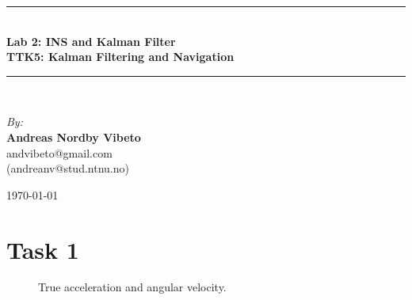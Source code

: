 \documentclass{article}
\newcommand{\HRule}{\rule{\linewidth}{0.5mm}}
\begin{document}

\begin{center}

\HRule \\[0.4cm]
{ \huge \bfseries Lab 2: INS and Kalman Filter \\[0.4cm] 
\Large \bfseries TTK5: Kalman Filtering and Navigation \\[0.4cm] } 

\HRule \\[1.5cm]

\begin{center} \large
\emph{By:}\\
\textbf{Andreas Nordby Vibeto}\\
andvibeto@gmail.com \\
(andreanv@stud.ntnu.no)
\end{center}

\vfill

{\large \monthyear\today}

\end{center}
\newpage
{}

\section*{Task 1}
\begin{figure}[!ht]
    \centering
    \caption{True acceleration and angular velocity.}
\end{figure}
\end{document}
